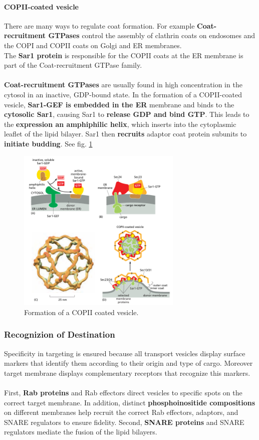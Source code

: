 \documentclass[../main.tex]{subfiles}
\begin{document}
\paragraph{COPII-coated vesicle}
There are many ways to regulate coat formation. For example \textbf{Coat-recruitment GTPases} control the assembly of clathrin coats on endosomes and the COPI and COPII coats on Golgi and ER membranes.\\
The \textbf{Sar1 protein} is responsible for the COPII coats at the ER membrane is part of the Coat-recruitment GTPase family. \\
\\
\textbf{Coat-recruitment GTPases} are usually found in high concentration in the cytosol in an inactive, GDP-bound state. In the formation of a COPII-coated vesicle, \textbf{Sar1-GEF is embedded in the ER} membrane and binds to the \textbf{cytosolic Sar1}, causing Sar1 to \textbf{release GDP and bind GTP}. This leads to the \textbf{expression an amphiphilic helix}, which inserts into the cytoplasmic leaflet of the lipid bilayer. Sar1 then \textbf{recruits} adaptor coat protein subunits to \textbf{initiate budding}. See fig. \ref{COPII}

\begin{figure}[H]
	\centering
	\includegraphics[width=0.7\textwidth]{11}
	\caption{Formation of a COPII coated vesicle.}
	\label{COPII}
\end{figure}


\subsubsection{Recognizion of Destination}
Specificity in targeting is ensured because all transport vesicles display surface markers that identify them according to their origin and type of cargo. Moreover target membrane displays complementary receptors that recognize this markers. \\
\\
First, \textbf{Rab proteins} and Rab effectors direct vesicles to specific spots on the correct target membrane. In addition, distinct \textbf{phosphoinositide compositions} on different membranes help recruit the correct Rab effectors, adaptors, and SNARE regulators to ensure fidelity. Second, \textbf{SNARE proteins} and SNARE regulators mediate the fusion of the lipid bilayers.
\end{document}
